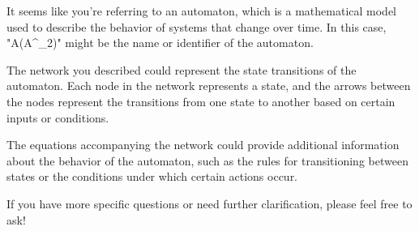 It seems like you're referring to an automaton, which is a mathematical model used to describe the behavior of systems that change over time. In this case, "A(A^_2)" might be the name or identifier of the automaton.

The network you described could represent the state transitions of the automaton. Each node in the network represents a state, and the arrows between the nodes represent the transitions from one state to another based on certain inputs or conditions.

The equations accompanying the network could provide additional information about the behavior of the automaton, such as the rules for transitioning between states or the conditions under which certain actions occur.

If you have more specific questions or need further clarification, please feel free to ask!